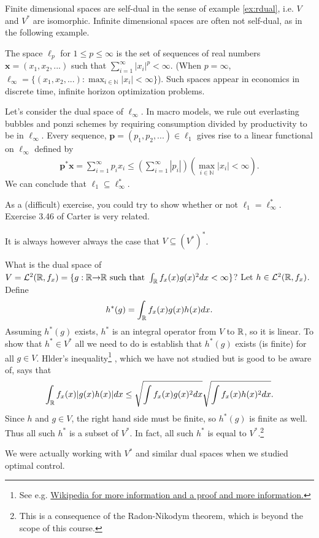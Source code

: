 Finite dimensional spaces are self-dual in the sense of example
\ref{ex:rdual}, i.e. $V$ and $V^*$ are isomorphic. Infinite
dimensional spaces are often not self-dual, as in the following
example.
\begin{example}\label{ex:lpdual}
  The space $\ell_p$ for $1 \leq p \leq \infty$ is the set of
  sequences of real numbers $\mathbf{x}=(x_1, x_2, ...)$ such that
  $\sum_{i=1}^\infty |x_i|^p < \infty$. (When $p = \infty$, $\ell_\infty = \{ 
  (x_1, x_2, ...) : \max_{i \in \mathbb{N}} |x_i| < \infty \}$). Such
  spaces appear in economics in discrete time, infinite horizon
  optimization problems. 

  Let's consider the dual space of $\ell_\infty$. In macro models, we
  rule out everlasting bubbles and ponzi schemes by requiring
  consumption divided by productivity to be in $\ell_\infty$. Every
  sequence, $\mathbf{p} = (p_1, p_2, ...) \in \ell_1$ gives rise to a linear
  functional on $\ell_\infty$ defined by
  \begin{align*}
    \mathbf{p}^\ast \mathbf{x} = \sum_{i=1}^\infty p_i x_i \leq
    \left(\sum_{i=1}^\infty |p_i| \right) \left(\max_{i \in
        \mathbb{N}} |x_i| < \infty\right). 
  \end{align*}
  We can conclude that $\ell_1 \subseteq \ell_\infty^\ast$. 

  As a (difficult) exercise, you could try to show whether or not
  $\ell_1 = \ell_\infty^\ast$. Exercise 3.46 of Carter is very
  related. 
\end{example}
It is always however always the case that $V \subseteq (V^*)^*$. 

\begin{example}
  What is the dual space of $V = \mathcal{L}^2(\mathbb{R},f_x) = \{g:
  \mathbb{R} {\rightarrow} \mathbb{R} \text{ such that } \int_{\mathbb{R}} f_x(x) g(x)^2 dx <
  \infty\}$? Let $h \in \mathcal{L}^2(\mathbb{R},f_x)$. Define 
  \[ h^\ast(g) = \int_{\mathbb{R}} f_x(x) g(x) h(x) dx. \] 
  Assuming $h^\ast(g)$
  exists, $h^\ast$ is an integral operator from $V$ to $\mathbb{R}$, so it is
  linear. To show that $h^\ast \in V^\ast$ all we need to do is
  establish that $h^\ast(g)$ exists (is finite) for all $g \in V$. 
  Hlder's inequality\footnote{See
    e.g.
    \href{http://en.wikipedia.org/wiki/H\%C3\%B6lder\%27s_inequality}
      {Wikipedia for more information and a proof and more
        information.}} , which we have not studied but is good to be
    aware of, says that
  \[ \int_{\mathbb{R}} f_x(x) |g(x) h(x)| dx \leq \sqrt{\int f_x(x) g(x)^2 dx}
  \sqrt{\int f_x(x) h(x)^2 dx}. \]
  Since $h$ and $g \in V$, the right hand side must be finite, so
  $h^\ast(g)$ is finite as well. Thus all such $h^\ast$ is a subset of
  $V^\ast$.   In fact, all such $h^\ast$ is equal to
  $V^\ast$.\footnote{This is a consequence of the Radon-Nikodym
    theorem, which is beyond the scope of this course.}
 
  We were actually working with $V^\ast$ and similar dual spaces when
  we studied optimal control.
\end{example}

